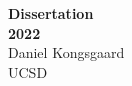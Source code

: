 \hypersetup{pageanchor=false}
\begin{titlingpage}
  \centering
  {\Huge\bfseries Dissertation} \\[1.5em]
  {\huge\bfseries 2022} \\[2.5em]
  {\huge Daniel Kongsgaard} \\[1.5em]
  \vfill
  {\Large UCSD}
\end{titlingpage}
\hypersetup{pageanchor=true}

